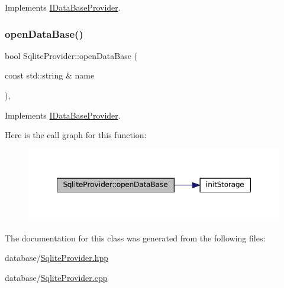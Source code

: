 Implements \mbox{\hyperlink{classIDataBaseProvider_a716a0f86654a2fbee3f4e25e2083f7cb}{I\+Data\+Base\+Provider}}.

\mbox{\label{classSqliteProvider_ac37c4f4cb4438b309f7b57eda4579b79}} 
\subsubsection{\texorpdfstring{open\+Data\+Base()}{openDataBase()}}
{\footnotesize\ttfamily bool Sqlite\+Provider\+::open\+Data\+Base (\begin{DoxyParamCaption}\item[{const std\+::string \&}]{name }\end{DoxyParamCaption})\hspace{0.3cm}{\ttfamily [override]}, {\ttfamily [virtual]}}



Implements \mbox{\hyperlink{classIDataBaseProvider_a3b467ba6923af62a82475a2a817eb1c8}{I\+Data\+Base\+Provider}}.

Here is the call graph for this function\+:
\nopagebreak
\begin{figure}[H]
\begin{center}
\leavevmode
\includegraphics[width=348pt]{classSqliteProvider_ac37c4f4cb4438b309f7b57eda4579b79_cgraph}
\end{center}
\end{figure}


The documentation for this class was generated from the following files\+:\begin{DoxyCompactItemize}
\item 
database/\mbox{\hyperlink{SqliteProvider_8hpp}{Sqlite\+Provider.\+hpp}}\item 
database/\mbox{\hyperlink{SqliteProvider_8cpp}{Sqlite\+Provider.\+cpp}}\end{DoxyCompactItemize}
